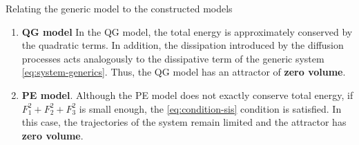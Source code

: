 
\begin{frame}{Relating the generic model to the constructed models}
	
	\begin{enumerate}
		\item \textbf{QG model} In the QG model, the total energy is approximately conserved by the quadratic terms. In addition, the dissipation introduced by the diffusion processes acts analogously to the dissipative term of the generic system \eqref{eq:system-generics}. Thus, the QG model has an attractor of \textbf{zero volume}.
		      
		          
		\item \textbf{PE model}. Although the PE model does not exactly conserve total energy, if $F_1^2 +F_2^2+F_3^2$ is small enough, the \eqref{eq:condition-sis} condition is satisfied. In this case, the trajectories of the system remain limited and the attractor has \textbf{zero volume}.
	\end{enumerate}
	
\end{frame}